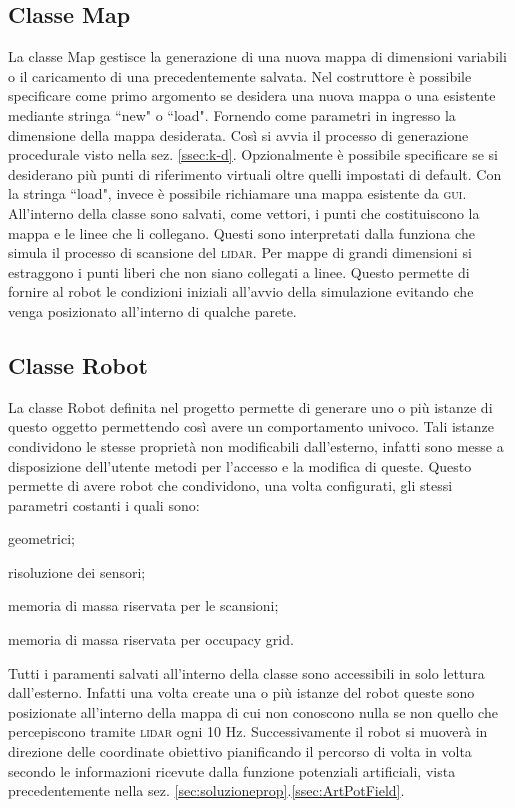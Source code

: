 \subsection{Classe Map}
\label{ssec:ClassMap}
La classe Map gestisce la generazione di una nuova mappa di dimensioni variabili
o il caricamento di una precedentemente salvata. Nel costruttore è possibile
specificare come primo argomento se desidera una nuova mappa o una esistente
mediante stringa ``new" o ``load".
Fornendo come parametri in ingresso la dimensione della mappa desiderata.
Così si avvia il processo di generazione procedurale visto
nella sez. \ref{ssec:k-d}. Opzionalmente è possibile specificare se si
desiderano più punti di riferimento virtuali oltre quelli impostati di default.
Con la stringa ``load", invece è possibile richiamare una mappa esistente da
\textsc{gui}.
All'interno della classe sono salvati, come vettori, i punti che costituiscono
la mappa e le linee che li collegano. Questi sono interpretati dalla funziona
che simula il processo di scansione del \textsc{lidar}.
Per mappe di grandi dimensioni si estraggono i punti liberi che non siano
collegati a linee. Questo permette di fornire al robot le condizioni iniziali
all'avvio della simulazione evitando che venga posizionato all'interno di
qualche parete.

\subsection{Classe Robot}
\label{ssec:ClassRobot}
La classe Robot definita nel progetto permette di generare uno o più istanze di
questo oggetto permettendo così avere un comportamento univoco.
Tali istanze condividono le stesse proprietà non modificabili dall'esterno,
infatti sono messe a disposizione dell'utente metodi per l'accesso e la
modifica di queste.
Questo permette di avere robot che condividono, una volta configurati, gli
stessi parametri costanti i quali sono:
\begin{enumerate*}[label={\alph*)},font={\bfseries}]
	\item geometrici;
	\item risoluzione dei sensori;
	\item memoria di massa riservata per le scansioni;
	\item memoria di massa riservata per occupacy grid.
\end{enumerate*}
Tutti i paramenti salvati all'interno della classe sono accessibili in solo
lettura dall'esterno.
Infatti una volta create una o più istanze del robot queste sono posizionate
all'interno della mappa di cui non conoscono nulla se non quello che
percepiscono tramite \textsc{lidar} ogni 10 \si{\hertz}. Successivamente il
robot si muoverà in direzione delle coordinate obiettivo pianificando il
percorso di volta in volta secondo le informazioni ricevute dalla funzione
potenziali artificiali, vista precedentemente nella
sez. \ref{sec:soluzioneprop}.\ref{ssec:ArtPotField}.

